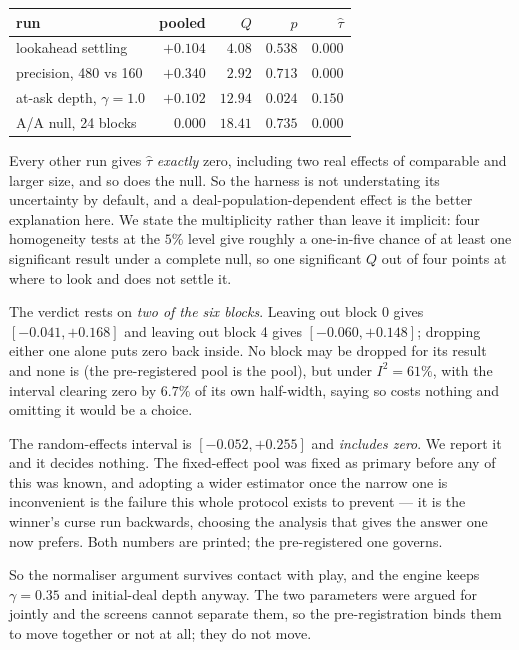 \documentclass[11pt,letterpaper]{article}
\begin{document}
\begin{center}
\small
\begin{tabular}{lrrrr}
\toprule
run & pooled & $Q$ & $p$ & $\hat\tau$ \\
\midrule
lookahead settling & $+0.104$ & $4.08$ & $0.538$ & $0.000$ \\
precision, 480 vs 160 & $+0.340$ & $2.92$ & $0.713$ & $0.000$ \\
at-ask depth, $\gamma = 1.0$ & $+0.102$ & $12.94$ & $\mathbf{0.024}$ & $\mathbf{0.150}$ \\
A/A null, 24 blocks & $0.000$ & $18.41$ & $0.735$ & $0.000$ \\
\bottomrule
\end{tabular}
\end{center}

Every other run gives $\hat\tau$ \emph{exactly} zero, including two real effects
of comparable and larger size, and so does the null. So the harness is not
understating its uncertainty by default, and a deal-population-dependent effect
is the better explanation here. We state the multiplicity rather than leave it
implicit: four homogeneity tests at the $5\%$ level give roughly a one-in-five
chance of at least one significant result under a complete null, so one
significant $Q$ out of four points at where to look and does not settle it.

The verdict rests on \emph{two of the six blocks}. Leaving out block 0 gives
$[-0.041, +0.168]$ and leaving out block 4 gives $[-0.060, +0.148]$; dropping
either one alone puts zero back inside. No block may be dropped for its result
and none is (the pre-registered pool is the pool), but under $I^2 = 61\%$,
with the interval clearing zero by $6.7\%$ of its own half-width, saying so costs
nothing and omitting it would be a choice.

The random-effects interval is $[-0.052, +0.255]$ and \emph{includes zero}. We
report it and it decides nothing. The fixed-effect pool was fixed as primary
before any of this was known, and adopting a wider estimator once the narrow one
is inconvenient is the failure this whole protocol exists to prevent --- it is
the winner's curse run backwards, choosing the analysis that gives the answer
one now prefers. Both numbers are printed; the pre-registered one governs.

So the normaliser argument survives contact with play, and the engine keeps
$\gamma = 0.35$ and initial-deal depth anyway. The two parameters were argued
for jointly and the screens cannot separate them, so the pre-registration binds
them to move together or not at all; they do not move.
\end{document}
